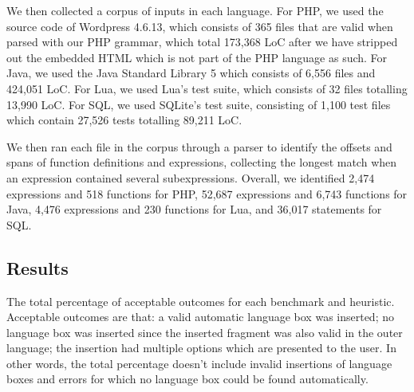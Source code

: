\documentclass[sigplan,screen]{acmart}\settopmatter{printfolios=true,printccs=false,printacmref=false}
\begin{document}
We then collected a corpus of inputs in each language.
For PHP, we used the source code of Wordpress 4.6.13, which consists of 365 files that are
valid when parsed with our PHP grammar, which total 173,368 LoC after we
have stripped out the embedded HTML which is not part of the PHP
language as such. For Java, we used the Java Standard Library 5 which consists
of 6,556 files and 424,051 LoC.
For Lua, we used Lua's test suite, which consists of 32 files totalling 13,990 LoC.
For SQL, we used SQLite's test suite, consisting of 1,100 test files which
contain 27,526 tests totalling 89,211 LoC.

We then ran each file in the corpus through a parser to identify the offsets and spans
of function definitions and expressions, collecting the longest match when an
expression contained several subexpressions. Overall, we identified 2,474 
expressions and 518 functions for PHP, 52,687 expressions and 6,743 functions for
Java, 4,476 expressions and 230 functions for Lua, and 36,017 statements for SQL.


\subsection{Results}

\begin{table}[tb]
    

    \vspace{7pt}
    \caption{The total percentage of acceptable outcomes for each benchmark and
    heuristic. Acceptable outcomes are that: a valid automatic language box
    was inserted; no language box was inserted since the inserted fragment
    was also valid in the outer language; the insertion had multiple options
    which are presented to the user. In other words, the total percentage
    doesn't include invalid insertions of language boxes and errors for which
    no language box could be found automatically.}
    \label{tbl:valid}
\end{table}
\end{document}
